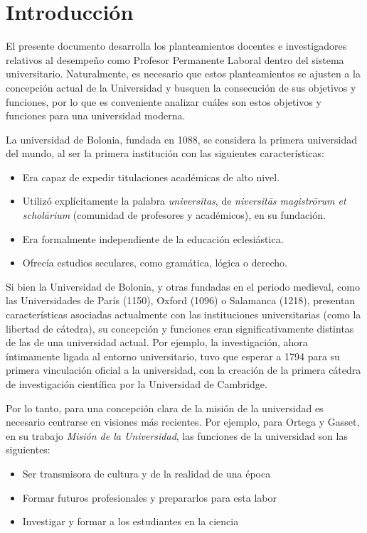 \documentclass[a4paper,12pt,twoside]{article}
\begin{document}
\section{Introducci\'on}
\label{intro}

El presente documento desarrolla los planteamientos docentes e investigadores relativos al desempeño como Profesor Permanente Laboral dentro del sistema universitario. Naturalmente, es necesario que estos planteamientos se ajusten a la concepción actual de la Universidad y busquen la consecución de sus objetivos y funciones, por lo que es conveniente analizar cuáles son estos objetivos y funciones para una universidad moderna.

La universidad de Bolonia, fundada en 1088, se considera la primera universidad del mundo, al ser la primera institución con las siguientes características:

\begin{itemize}
\item Era capaz de expedir titulaciones académicas de alto nivel.
\item Utilizó explícitamente la palabra \textit{universitas}, de \textit{niversitās magistrōrum et scholārium} (comunidad de profesores y académicos), en su fundación.
\item Era formalmente independiente de la educación eclesiástica.
\item Ofrecía estudios seculares, como gramática, lógica o derecho.
\end{itemize}

Si bien la Universidad de Bolonia, y otras fundadas en el periodo medieval, como las Universidades de París (1150), Oxford (1096) o Salamanca (1218), presentan características asociadas actualmente con las instituciones universitarias (como la libertad de cátedra), su concepción y funciones eran significativamente distintas de las de una universidad actual. Por ejemplo, la investigación, ahora íntimamente ligada al entorno universitario, tuvo que esperar a 1794 para su primera vinculación oficial a la universidad, con la creación de la primera cátedra de investigación científica por la Universidad de Cambridge.

Por lo tanto, para una concepción clara de la misión de la universidad es necesario centrarse en visiones más recientes. Por ejemplo, para Ortega y Gasset, en su trabajo \textit{Misión de la Universidad}\cite{ortega_gasset}, las funciones de la universidad son las siguientes:

\begin{itemize}
\item Ser transmisora de cultura y de la realidad de una época
\item Formar futuros profesionales y prepararlos para esta labor
\item Investigar y formar a los estudiantes en la ciencia
\end{itemize}
\end{document}
